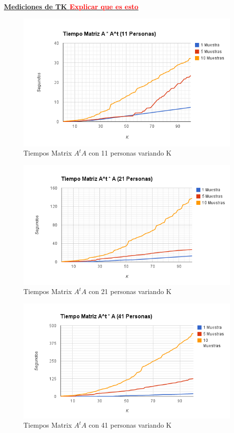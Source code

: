 \underline{\textbf{Mediciones de TK \textcolor{red}{Explicar que es esto}}}

\begin{figure}[H]
\includegraphics[width=1\textwidth]{img/imagea.png}
     \caption{Tiempos Matrix $A^tA$ con 11 personas variando K}
     \label{fig:figura1}
\end{figure}

\begin{figure}[H]
\includegraphics[width=1\textwidth]{img/imageb.png}
     \caption{Tiempos Matrix $A^tA$ con 21 personas variando K}
     \label{fig:figura1}
\end{figure}

\begin{figure}[H]
\includegraphics[width=1\textwidth]{img/imagec.png}
     \caption{Tiempos Matrix $A^tA$ con 41 personas variando K}
     \label{fig:figura1}
\end{figure}


